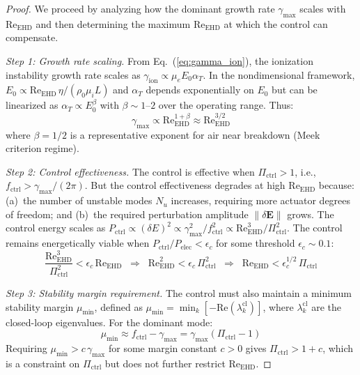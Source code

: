\documentclass[12pt,twocolumn]{article}
\newcommand{\ee}{\mathbf{E}}
\newcommand{\Reehd}{\mathrm{Re}_{\mathrm{EHD}}}
\newcommand{\Pctrl}{\Pi_{\mathrm{ctrl}}}
\begin{document}
\begin{proof}
We proceed by analyzing how the dominant growth rate
$\gamma_{\max}$ scales with $\Reehd$ and then determining the
maximum $\Reehd$ at which the control can compensate.

\textit{Step 1: Growth rate scaling.}
From Eq.~(\ref{eq:gamma_ion}), the ionization instability growth
rate scales as $\gamma_{\mathrm{ion}} \propto \mu_e E_0 \alpha_T$.
In the nondimensional framework, $E_0 \propto \Reehd\,\eta /
(\rho_0 \mu_i L)$ and $\alpha_T$ depends exponentially on $E_0$
but can be linearized as $\alpha_T \propto E_0^\beta$ with
$\beta \sim 1$--$2$ over the operating range. Thus:
\begin{equation}
  \gamma_{\max} \propto \Reehd^{1+\beta}
  \approx \Reehd^{3/2}
  \label{eq:gamma_scaling}
\end{equation}
where $\beta = 1/2$ is a representative exponent for air near
breakdown (Meek criterion regime).

\textit{Step 2: Control effectiveness.}
The control is effective when $\Pctrl > 1$, i.e.,
$f_{\mathrm{ctrl}} > \gamma_{\max}/(2\pi)$. But the control
effectiveness degrades at high $\Reehd$ because: (a)~the number of
unstable modes $N_u$ increases, requiring more actuator degrees of
freedom; and (b)~the required perturbation amplitude
$\|\delta\ee\|$ grows. The control energy scales as
$P_{\mathrm{ctrl}} \propto (\delta E)^2 \propto
\gamma_{\max}^2 / f_{\mathrm{ctrl}}^2 \propto
\Reehd^3 / \Pctrl^2$. The control remains energetically viable
when $P_{\mathrm{ctrl}} / P_{\mathrm{elec}} < \epsilon_c$ for
some threshold $\epsilon_c \sim 0.1$:
\begin{equation}
  \frac{\Reehd^3}{\Pctrl^2} < \epsilon_c\,\Reehd
  \;\;\Longrightarrow\;\;
  \Reehd^2 < \epsilon_c\,\Pctrl^2
  \;\;\Longrightarrow\;\;
  \Reehd < \epsilon_c^{1/2}\,\Pctrl
  \label{eq:energetic_bound}
\end{equation}

\textit{Step 3: Stability margin requirement.}
The control must also maintain a minimum stability margin
$\mu_{\min}$, defined as
$\mu_{\min} = \min_k[-\mathrm{Re}(\lambda_k^{\mathrm{cl}})]$,
where $\lambda_k^{\mathrm{cl}}$ are the closed-loop eigenvalues.
For the dominant mode:
\begin{equation}
  \mu_{\min} \approx f_{\mathrm{ctrl}} - \gamma_{\max}
  = \gamma_{\max}(\Pctrl - 1)
  \label{eq:stability_margin}
\end{equation}
Requiring $\mu_{\min} > c\,\gamma_{\max}$ for some margin constant
$c > 0$ gives $\Pctrl > 1 + c$, which is a constraint on $\Pctrl$
but does not further restrict $\Reehd$.


\end{proof}
\end{document}
